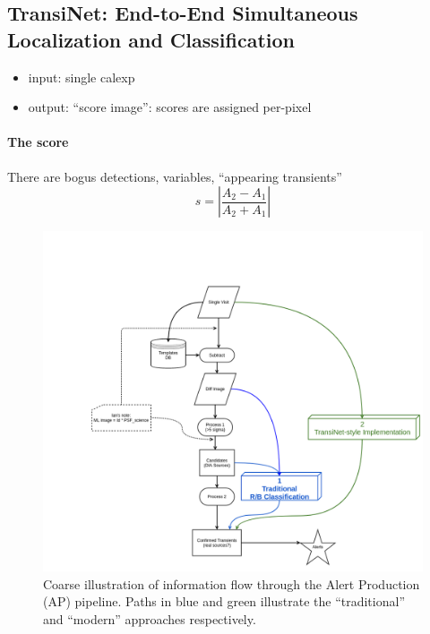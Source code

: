 \subsection{TransiNet: End-to-End Simultaneous Localization and Classification}

\begin{itemize}
  \item input: single calexp
  \item output: ``score image'': scores are assigned per-pixel
\end{itemize}


\paragraph{The score}
There are bogus detections, variables, ``appearing transients''
\begin{equation}
  s=\left| \frac{A_2-A_1}{A_2+A_1} \right|
\end{equation}


\begin{figure}
  \centering
  \includegraphics[width=1\textwidth]{material/diagram}
  \caption{Coarse illustration of information flow through the Alert Production (AP) pipeline. Paths in blue and green illustrate the ``traditional'' and ``modern'' approaches respectively.}
  \label{fig:diagram}
\end{figure}

